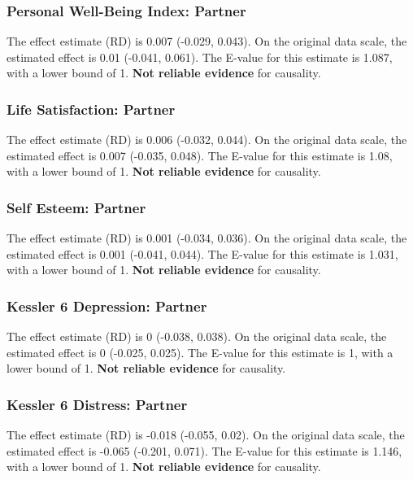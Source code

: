 \documentclass[
  singlecolumn]{article}
\begin{document}
\subsubsection{Personal Well-Being Index:
Partner}\label{personal-well-being-index-partner}

The effect estimate (RD) is 0.007 (-0.029, 0.043). On the original data
scale, the estimated effect is 0.01 (-0.041, 0.061). The E-value for
this estimate is 1.087, with a lower bound of 1. \textbf{Not reliable
evidence} for causality.

\subsubsection{Life Satisfaction:
Partner}\label{life-satisfaction-partner}

The effect estimate (RD) is 0.006 (-0.032, 0.044). On the original data
scale, the estimated effect is 0.007 (-0.035, 0.048). The E-value for
this estimate is 1.08, with a lower bound of 1. \textbf{Not reliable
evidence} for causality.

\subsubsection{Self Esteem: Partner}\label{self-esteem-partner}

The effect estimate (RD) is 0.001 (-0.034, 0.036). On the original data
scale, the estimated effect is 0.001 (-0.041, 0.044). The E-value for
this estimate is 1.031, with a lower bound of 1. \textbf{Not reliable
evidence} for causality.

\subsubsection{Kessler 6 Depression:
Partner}\label{kessler-6-depression-partner}

The effect estimate (RD) is 0 (-0.038, 0.038). On the original data
scale, the estimated effect is 0 (-0.025, 0.025). The E-value for this
estimate is 1, with a lower bound of 1. \textbf{Not reliable evidence}
for causality.

\subsubsection{Kessler 6 Distress:
Partner}\label{kessler-6-distress-partner}

The effect estimate (RD) is -0.018 (-0.055, 0.02). On the original data
scale, the estimated effect is -0.065 (-0.201, 0.071). The E-value for
this estimate is 1.146, with a lower bound of 1. \textbf{Not reliable
evidence} for causality.
\end{document}
